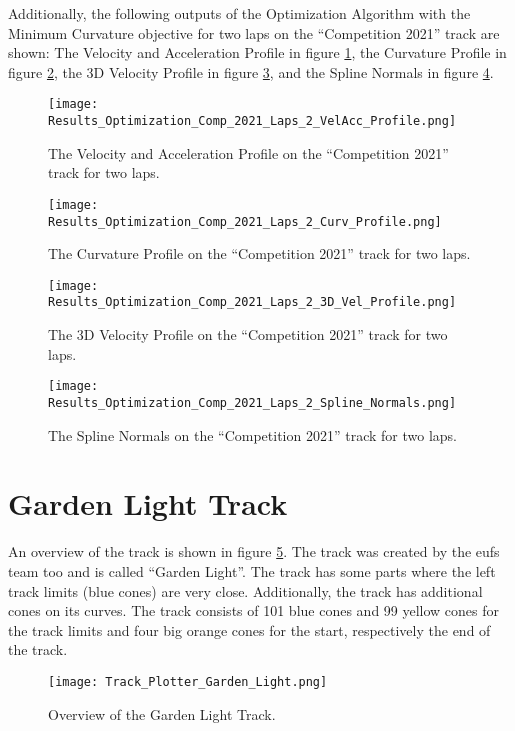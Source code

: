Additionally, the following outputs of the Optimization Algorithm with the Minimum Curvature objective for two laps on the ``Competition 2021'' track are shown: The Velocity and Acceleration Profile in figure \ref{fig:Results Comp 2021 Laps 2 VelAcc Profile}, the Curvature Profile in figure \ref{fig:Results Comp 2021 Laps 2 Curv Profile}, the 3D Velocity Profile in figure \ref{fig:Results Comp 2021 Laps 2 3D Vel Profile}, and the Spline Normals in figure \ref{fig:Results Comp 2021 Laps 2 Spline Normals}.
\begin{figure}[H]
    \centering
    \texttt{[image: Results\_Optimization\_Comp\_2021\_Laps\_2\_VelAcc\_Profile.png]}
    \caption{The Velocity and Acceleration Profile on the ``Competition 2021'' track for two laps.}
    \label{fig:Results Comp 2021 Laps 2 VelAcc Profile}
\end{figure}
\begin{figure}[H]
    \centering
    \texttt{[image: Results\_Optimization\_Comp\_2021\_Laps\_2\_Curv\_Profile.png]}
    \caption{The Curvature Profile on the ``Competition 2021'' track for two laps.}
    \label{fig:Results Comp 2021 Laps 2 Curv Profile}
\end{figure}
\begin{figure}[H]
    \centering
    \texttt{[image: Results\_Optimization\_Comp\_2021\_Laps\_2\_3D\_Vel\_Profile.png]}
    \caption{The 3D Velocity Profile on the ``Competition 2021'' track for two laps.}
    \label{fig:Results Comp 2021 Laps 2 3D Vel Profile}
\end{figure}
\begin{figure}[H]
    \centering
    \texttt{[image: Results\_Optimization\_Comp\_2021\_Laps\_2\_Spline\_Normals.png]}
    \caption{The Spline Normals on the ``Competition 2021'' track for two laps.}
    \label{fig:Results Comp 2021 Laps 2 Spline Normals}
\end{figure}

\section{Garden Light Track} \label{sec:Results Garden Light Track}
An overview of the track is shown in figure \ref{fig:Results Garden Light Initial}. The track was created by the \acrshort{eufs} team too and is called ``Garden Light''. \cite{eufs_sim_gitlab} The track has some parts where the left track limits (blue cones) are very close. Additionally, the track has additional cones on its curves. The track consists of 101 blue cones and 99 yellow cones for the track limits and four big orange cones for the start, respectively the end of the track.
\begin{figure}[H]
    \centering
    \texttt{[image: Track\_Plotter\_Garden\_Light.png]}
    \caption{Overview of the Garden Light Track.}
    \label{fig:Results Garden Light Initial}
\end{figure}

